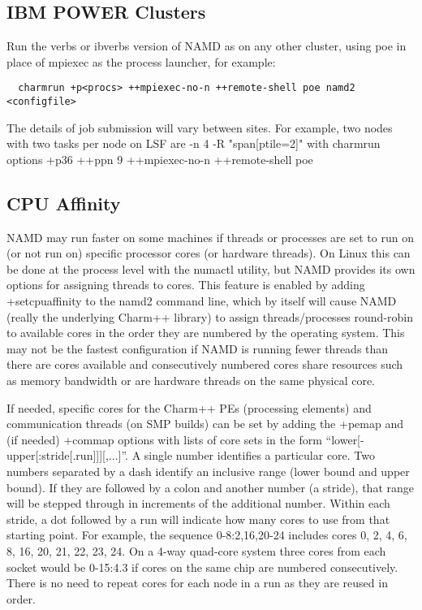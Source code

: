 \subsection{IBM POWER Clusters}

Run the verbs or ibverbs version of NAMD as on any other cluster,
using poe in place of mpiexec as the process launcher, for example:
  
\begin{verbatim}
  charmrun +p<procs> ++mpiexec-no-n ++remote-shell poe namd2 <configfile>
\end{verbatim}
  
The details of job submission will vary between sites.  For example,
two nodes with two tasks per node on LSF are -n 4 -R "span[ptile=2]"
with charmrun options +p36 ++ppn 9 ++mpiexec-no-n ++remote-shell poe

\subsection{CPU Affinity}

NAMD may run faster on some machines if threads or processes are set to
run on (or not run on) specific processor cores (or hardware threads).
On Linux this can be done at the process level with the numactl utility,
but NAMD provides its own options for assigning threads to cores.  This
feature is enabled by adding +setcpuaffinity to the namd2 command line,
which by itself will cause NAMD (really the underlying Charm++ library)
to assign threads/processes round-robin to available cores in the order
they are numbered by the operating system.  This may not be the fastest
configuration if NAMD is running fewer threads than there are cores
available and consecutively numbered cores share resources such as
memory bandwidth or are hardware threads on the same physical core.

If needed, specific cores for the Charm++ PEs (processing elements) and
communication threads (on SMP builds) can be set by adding the +pemap
and (if needed) +commap options with lists of core sets in the form
``lower[-upper[:stride[.run]]][,...]''.  A single number identifies a
particular core.  Two numbers separated by a dash identify an inclusive
range (lower bound and upper bound).  If they are followed by a colon and
another number (a stride), that range will be stepped through in increments
of the additional number.  Within each stride, a dot followed by a run will
indicate how many cores to use from that starting point.  For example, the
sequence 0-8:2,16,20-24 includes cores 0, 2, 4, 6, 8, 16, 20, 21, 22, 23, 24.
On a 4-way quad-core system three cores from each socket would be 0-15:4.3
if cores on the same chip are numbered consecutively.  There is no need
to repeat cores for each node in a run as they are reused in order.

